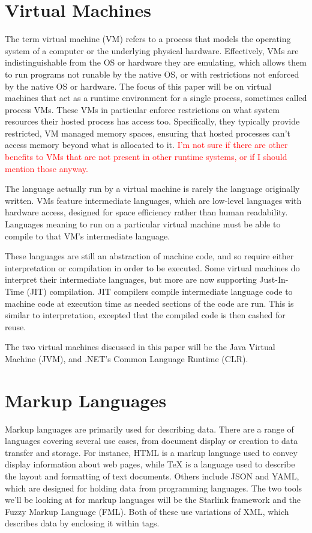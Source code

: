 \documentclass{sig-alternate}
\newcommand{\mycomment}[1]{\textcolor{red}{#1}}
\begin{document}
\section{Virtual Machines}\label{VM}


The term virtual machine (VM) refers to a process that models the operating system of a computer or the underlying physical hardware. Effectively, VMs are indistinguishable from the OS or hardware they are emulating, which allows them to run programs not runable by the native OS, or with restrictions not enforced by the native OS or hardware.
The focus of this paper will be on virtual machines that act as a runtime environment for a single process, sometimes called process VMs. These VMs in particular enforce restrictions on what system resources their hosted process has access too. Specifically, they typically provide restricted, VM managed memory spaces, ensuring that hosted processes can't access memory beyond what is allocated to it.\cite{wiki:VM}
\mycomment{I'm not sure if there are other benefits to VMs that are not present in other runtime systems, or if I should mention those anyway.}

The language actually run by a virtual machine is rarely the language originally written. VMs feature intermediate languages, which are low-level languages with hardware access, designed for space efficiency rather than human readability. Languages meaning to run on a particular virtual machine must be able to compile to that VM's intermediate language.

These languages are still an abstraction of machine code, and so require either interpretation or compilation in order to be executed. Some virtual machines do interpret their intermediate languages, but more are now supporting Just-In-Time (JIT) compilation. JIT compilers compile intermediate language code to machine code at execution time as needed sections of the code are run. This is similar to interpretation, excepted that the compiled code is then cashed for reuse.\cite{wiki:JIT}

The two virtual machines discussed in this paper will be the Java Virtual Machine (JVM), and .NET's Common Language Runtime (CLR).


\section{Markup Languages}\label{ML}
Markup languages are primarily used for describing data. There are a range of languages covering several use cases, from document display or creation to data transfer and storage. For instance, HTML is a markup language used to convey display information about web pages, while TeX is a language used to describe the layout and formatting of text documents. Others include JSON and YAML, which are designed for holding data from programming languages. The two tools we'll be looking at for markup languages will be the Starlink framework and the Fuzzy Markup Language (FML). Both of these use variations of XML, which describes data by enclosing it within tags.
\end{document}
